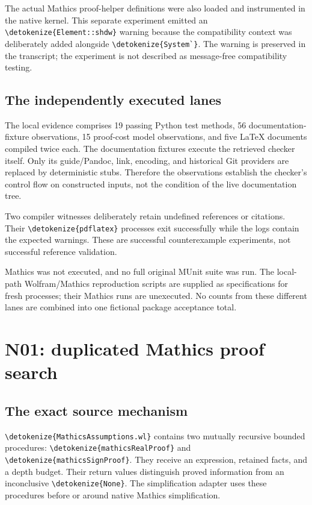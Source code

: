 \documentclass[11pt,letterpaper]{article}
\newcommand{\code}[1]{\expandafter\nolinkurl\expandafter{\detokenize{#1}}}
\begin{document}
The actual Mathics proof-helper definitions were also loaded and instrumented in the native kernel. This separate experiment emitted an \code{Element::shdw} warning because the compatibility context was deliberately added alongside \code{System`}. The warning is preserved in the transcript; the experiment is not described as message-free compatibility testing.

\subsection{The independently executed lanes}

The local evidence comprises 19 passing Python test methods, 56 documentation-fixture observations, 15 proof-cost model observations, and five LaTeX documents compiled twice each. The documentation fixtures execute the retrieved checker itself. Only its guide/Pandoc, link, encoding, and historical Git providers are replaced by deterministic stubs. Therefore the observations establish the checker's control flow on constructed inputs, not the condition of the live documentation tree.

Two compiler witnesses deliberately retain undefined references or citations. Their \code{pdflatex} processes exit successfully while the logs contain the expected warnings. These are successful counterexample experiments, not successful reference validation.

Mathics was not executed, and no full original MUnit suite was run. The local-path Wolfram/Mathics reproduction scripts are supplied as specifications for fresh processes; their Mathics runs are unexecuted. No counts from these different lanes are combined into one fictional package acceptance total.

\section{N01: duplicated Mathics proof search}
\subsection{The exact source mechanism}

\code{MathicsAssumptions.wl} contains two mutually recursive bounded procedures: \code{mathicsRealProof} and \code{mathicsSignProof}. They receive an expression, retained facts, and a depth budget. Their return values distinguish proved information from an inconclusive \code{None}. The simplification adapter uses these procedures before or around native Mathics simplification.\cite{mathicsass,mathicssimp}
\end{document}
